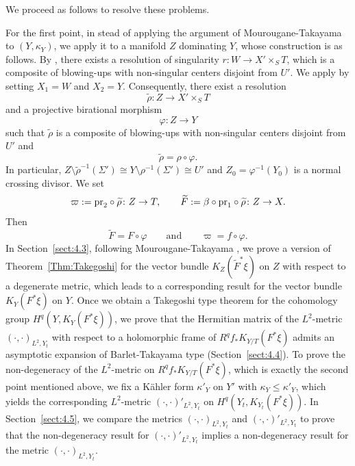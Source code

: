 \documentclass[amscd, leqno]{amsart}
\theoremstyle{plain}
\theoremstyle{definition}
\theoremstyle{remark}
\begin{document}
We proceed as follows to resolve these problems.
\par
For the first point, in stead of applying the argument of Mourougane-Takayama to $(Y,\kappa_{Y})$, we apply it to a manifold $Z$ 
dominating $Y$, whose construction is as follows. By \cite[Th.\,13.2]{BierstoneMilman97}, there exists a resolution of singularity 
$r \colon W\to X'\times_{S}T$, which is a composite of blowing-ups with non-singular centers disjoint from $U'$. 
We apply \cite[Lemma 1.3.1]{AKMW02} by setting $X_{1}=W$ and $X_{2}=Y$. Consequently, there exist a resolution 
$$
\widetilde{\rho} \colon Z\to X'\times_{S}T
$$ 
and a projective birational morphism 
$$
\varphi\colon Z\to Y
$$ 
such that $\widetilde{\rho}$ is a composite of blowing-ups with non-singular centers disjoint from $U'$ and 
$$
\widetilde{\rho} = \rho \circ \varphi.
$$ 
In particular, 
$Z\setminus\widetilde{\rho}^{-1}(\varSigma')\cong Y\setminus \rho^{-1}(\varSigma')\cong U'$ and $Z_{0}={\varphi}^{-1}(Y_{0})$ is a normal crossing divisor.
We set 
\begin{equation}
\label{eqn:proj:Z}
\varpi := {\rm pr}_{2} \circ \widetilde{\rho} \colon Z\to T,
\qquad
\widetilde{F} := \beta \circ{\rm pr}_{1} \circ \widetilde{\rho} \colon Z\to X.
\end{equation}
Then 
$$
\widetilde{F} = F \circ \varphi 
\qquad\text{and}\qquad 
\varpi = f \circ \varphi.
$$
In Section~\ref{sect:4.3}, following Mourougane-Takayama \cite[Prop.\,4.4]{MourouganeTakayama09}, we prove a version of 
Theorem~\ref{Thm:Takegoshi} for the vector bundle $K_{Z}(\widetilde{F}^{*}\xi)$ on $Z$ with respect to a degenerate metric, 
which leads to a corresponding result for the vector bundle $K_{Y}(F^{*}\xi)$ on $Y$. 
Once we obtain a Takegoshi type theorem for the cohomology group $H^{q}(Y, K_{Y}(F^{*}\xi))$, we prove that the Hermitian matrix of 
the $L^{2}$-metric $(\cdot,\cdot)_{L^{2},Y_{t}}$ with respect to a holomorphic frame of $R^{q}f_{*}K_{Y/T}(F^{*}\xi)$ admits 
an asymptotic expansion of Barlet-Takayama type (Section~\ref{sect:4.4}). 
To prove the non-degeneracy of the $L^{2}$-metric on $R^{q}f_{*}K_{Y/T}(F^{*}\xi)$, which is exactly the second point mentioned above, 
we fix a K\"ahler form $\kappa'_{Y}$ on $Y'$ with $\kappa_{Y} \leq \kappa'_{Y}$, which yields 
the corresponding $L^{2}$-metric $( \cdot, \cdot)'_{L^{2},Y_{t}}$ on $H^{q}(Y_{t}, K_{Y_{t}}(F^{*}\xi))$. 
In Section~\ref{sect:4.5}, we compare the metrics $( \cdot, \cdot)_{L^{2},Y_{t}}$ and $( \cdot, \cdot)'_{L^{2},Y_{t}}$ to prove that the 
non-degeneracy result \cite[Lemmas~4.7, 4.8]{MourouganeTakayama09} for $( \cdot, \cdot)'_{L^{2},Y_{t}}$ implies a non-degeneracy result 
for the metric $( \cdot, \cdot)_{L^{2},Y_{t}}$.
\end{document}
